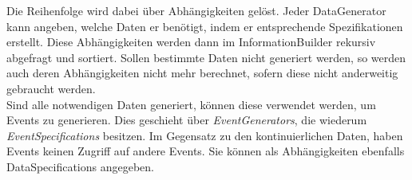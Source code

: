 \documentclass[11pt,a4paper]{article}
\begin{document}
Die Reihenfolge wird dabei über Abhängigkeiten gelöst. Jeder DataGenerator kann angeben, welche Daten er benötigt, indem er entsprechende Spezifikationen erstellt. Diese Abhängigkeiten werden dann im InformationBuilder rekursiv abgefragt und sortiert. Sollen bestimmte Daten nicht generiert werden, so werden auch deren Abhängigkeiten nicht mehr berechnet, sofern diese nicht anderweitig gebraucht werden.\\
Sind alle notwendigen Daten generiert, können diese verwendet werden, um Events zu generieren. Dies geschieht über \textit{EventGenerators}, die wiederum \textit{EventSpecifications} besitzen. Im Gegensatz zu den kontinuierlichen Daten, haben Events keinen Zugriff auf andere Events. Sie können als Abhängigkeiten ebenfalls DataSpecifications angegeben.




\end{document}
